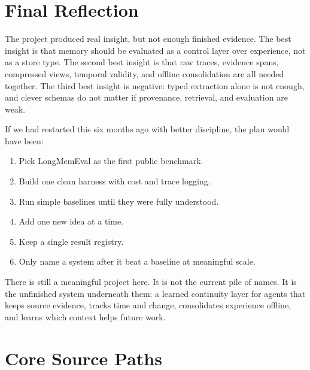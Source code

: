 \documentclass[11pt]{article}
\begin{document}
\section{Final Reflection}

The project produced real insight, but not enough finished evidence. The best insight is that memory should be evaluated as a control layer over experience, not as a store type. The second best insight is that raw traces, evidence spans, compressed views, temporal validity, and offline consolidation are all needed together. The third best insight is negative: typed extraction alone is not enough, and clever schemas do not matter if provenance, retrieval, and evaluation are weak.

If we had restarted this six months ago with better discipline, the plan would have been:

\begin{enumerate}
  \item Pick LongMemEval as the first public benchmark.
  \item Build one clean harness with cost and trace logging.
  \item Run simple baselines until they were fully understood.
  \item Add one new idea at a time.
  \item Keep a single result registry.
  \item Only name a system after it beat a baseline at meaningful scale.
\end{enumerate}

There is still a meaningful project here. It is not the current pile of names. It is the unfinished system underneath them: a learned continuity layer for agents that keeps source evidence, tracks time and change, consolidates experience offline, and learns which context helps future work.

\appendix

\section{Core Source Paths}
\end{document}
